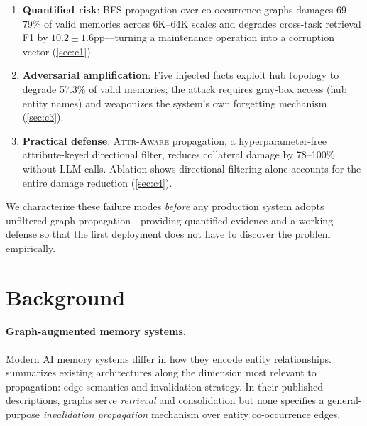 \documentclass{article}
\newcommand{\attraware}{\textsc{Attr-Aware}}
\begin{document}
\begin{enumerate}
  \item \textbf{Quantified risk}: BFS propagation over co-occurrence graphs damages 69--79\% of valid memories across 6K--64K scales and degrades cross-task retrieval F1 by $10.2\pm1.6$pp---turning a maintenance operation into a corruption vector (\cref{sec:c1}).

  \item \textbf{Adversarial amplification}: Five injected facts exploit hub topology to degrade 57.3\% of valid memories; the attack requires gray-box access (hub entity names) and weaponizes the system's own forgetting mechanism (\cref{sec:c3}).

  \item \textbf{Practical defense}: \attraware{} propagation, a hyperparameter-free attribute-keyed directional filter, reduces collateral damage by 78--100\% without LLM calls.
  Ablation shows directional filtering alone accounts for the entire damage reduction (\cref{sec:c4}).
\end{enumerate}

\noindent We characterize these failure modes \textit{before} any production system adopts unfiltered graph propagation---providing quantified evidence and a working defense so that the first deployment does not have to discover the problem empirically.


\section{Background}
\label{sec:background}

\paragraph{Graph-augmented memory systems.}
Modern AI memory systems differ in how they encode entity relationships.
 summarizes existing architectures along the dimension most relevant to propagation: edge semantics and invalidation strategy.
In their published descriptions, graphs serve \textit{retrieval} and consolidation but none specifies a general-purpose \textit{invalidation propagation} mechanism over entity co-occurrence edges.
\end{document}
